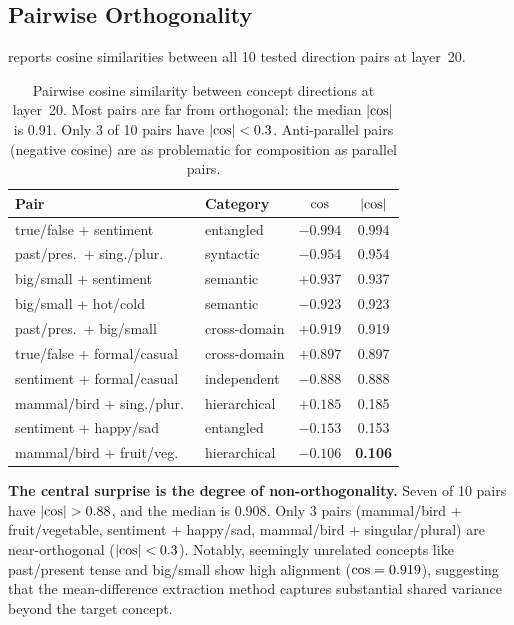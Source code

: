 \subsection{Pairwise Orthogonality}
\label{sec:orthogonality}

 reports cosine similarities between all 10 tested
direction pairs at layer~20.

\begin{table}[t]
    \centering
    \caption{Pairwise cosine similarity between concept directions at layer~20.
    Most pairs are far from orthogonal: the median $|\text{cos}|$ is 0.91. Only 3
    of 10 pairs have $|\text{cos}| < 0.3$. Anti-parallel pairs (negative cosine)
    are as problematic for composition as parallel pairs.}
    \begin{tabular}{@{}llcc@{}}
        \toprule
        \textbf{Pair} & \textbf{Category} & $\text{cos}$ & $|\text{cos}|$ \\
        \midrule
        true/false + sentiment        & entangled     & $-0.994$ & 0.994 \\
        past/pres.\ + sing./plur.\    & syntactic     & $-0.954$ & 0.954 \\
        big/small + sentiment         & semantic      & $+0.937$ & 0.937 \\
        big/small + hot/cold          & semantic      & $-0.923$ & 0.923 \\
        past/pres.\ + big/small       & cross-domain  & $+0.919$ & 0.919 \\
        true/false + formal/casual    & cross-domain  & $+0.897$ & 0.897 \\
        sentiment + formal/casual     & independent   & $-0.888$ & 0.888 \\
        \midrule
        mammal/bird + sing./plur.\    & hierarchical  & $+0.185$ & 0.185 \\
        sentiment + happy/sad         & entangled     & $-0.153$ & 0.153 \\
        mammal/bird + fruit/veg.\     & hierarchical  & $-0.106$ & \textbf{0.106} \\
        \bottomrule
    \end{tabular}
    \label{tab:orthogonality}
\end{table}

{\bf The central surprise is the degree of non-orthogonality.} Seven of 10
pairs have $|\text{cos}| > 0.88$, and the median is $0.908$. Only 3 pairs
(mammal/bird + fruit/vegetable, sentiment + happy/sad, mammal/bird +
singular/plural) are near-orthogonal ($|\text{cos}| < 0.3$). Notably, seemingly
unrelated concepts like past/present tense and big/small show high alignment
($\text{cos} = 0.919$), suggesting that the mean-difference extraction method
captures substantial shared variance beyond the target concept.

